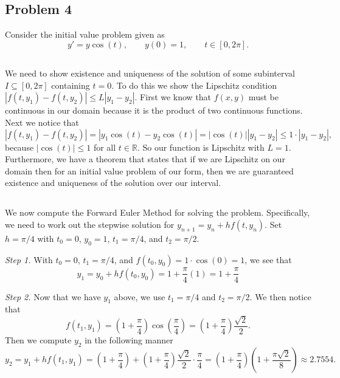 \documentclass[12pt]{amsart}
\begin{document}
\begin{onehalfspace}
        \section{Problem 4}
        Consider the initial value problem given as
        \[
            y' = y\cos(t),\qquad y(0)=1,\qquad t\in[0,2\pi].
        \]
        \subsection{}
        We need to show existence and uniqueness of the solution of some subinterval $I\subseteq[0,2\pi]$ containing
        $t=0$.
        To do this we show the Lipschitz condition $|f(t,y_1) - f(t,y_2)|\le L |y_1 - y_2|$.
        First we know that $f(x,y)$ must be continuous in our domain because it is the product of two continuous functions.
        Next we notice that
        \[
            |f(t,y_1) - f(t,y_2)| = |y_1\cos(t) - y_2\cos(t)| = |\cos(t)||y_1-y_2|\le 1\cdot |y_1 - y_2|,
        \]
        because $|\cos(t)|\le 1$ for all $t\in\mathbb{R}$.
        So our function is Lipschitz with $L=1$.
        Furthermore, we have a theorem that states that if we are Lipschitz on our domain then for an initial value problem
        of our form, then we are guaranteed existence and uniqueness of the solution over our interval.

        \subsection{}
        We now compute the Forward Euler Method for solving the problem.
        Specifically, we need to work out the stepwise solution for $y_{n+1}=y_n + hf(t,y_n)$.
        Set $h=\pi/4$ with $t_0=0$, $y_0=1$, $t_1=\pi/4$, and $t_2=\pi/2$.

        \emph{Step 1.}
        With $t_0=0$, $t_1=\pi/4$, and $f(t_0,y_0) = 1\cdot\cos(0) = 1$, we see that
        \[
            y_1 = y_0 + h f(t_0,y_0) = 1 + \frac{\pi}{4}(1) = 1 + \frac{\pi}{4}
        \]

        \emph{Step 2.}
        Now that we have $y_1$ above, we use $t_1=\pi/4$ and $t_2=\pi/2$.
        We then notice that
        \[
            f(t_1,y_1) = \left(1 + \frac{\pi}{4}\right)\cos\left(\frac{\pi}{4}\right) = \left(1 + \frac{\pi}{4}\right)\frac{\sqrt{2}}{2}.
        \]
        Then we compute $y_2$ in the following manner
        \[
            y_2 = y_1 + hf(t_1,y_1) = \left(1+\frac{\pi}{4}\right) + \left(1 + \frac{\pi}{4}\right)\frac{\sqrt{2}}{2}\cdot\frac{\pi}{4}
            = \left(1 + \frac{\pi}{4}\right)\left(1 + \frac{\pi\sqrt{2}}{8}\right)\approx 2.7554.
        \]


\end{onehalfspace}
\end{document}
